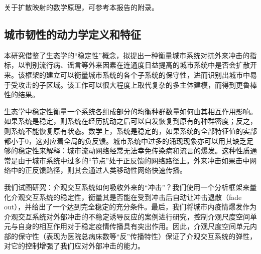 关于扩散映射的数学原理，可参考本报告的附录。


\subsection{城市韧性的动力学定义和特征}

本研究借鉴了生态学的“稳定性”概念\cite{may1972will, allesina2012stability}，拟提出一种衡量城市系统对抗外来冲击的指标，以判别流行病、谣言等外来因素在连通度日益提高的城市系统中是否会扩散开来。该框架的建立可以衡量城市系统的各个子系统的保守性，进而识别出城市中易于受攻击的子区域。该工作可以很大程度上取代复杂的多主体建模，而得到更鲁棒性的结果。

生态学中稳定性衡量一个系统各组成部分的均衡种群数量如何由其相互作用影响。如果系统是稳定，则系统在经历扰动之后可以自发恢复到原有的种群密度；反之，则系统不能恢复原有状态。数学上，系统是稳定的，如果系统的全部特征值的实部都小于$0$，这对应着全局的负反馈\cite{coyte2015ecology}。城市系统中过多的涌现现象亦可以用其缺乏足够的稳定性来解释：城市流动网络经常无法幸免传染病和流言的爆发。这种性质通常是由于城市系统中过多的“节点”处于正反馈的网络路径上。外来冲击如果击中网络中的正反馈路径，则其会通过人类移动性网络快速传播。

我们试图研究：介观交互系统如何吸收外来的“冲击”？我们使用一个分析框架来量化介观交互系统的稳定性，衡量其是否能在受到冲击后自动让冲击退散（fade out），并给出了一个达到完全稳定的充分条件。最后，我们将城市内疫情爆发作为介观交互系统对外部冲击的不稳定诱导反应的案例进行研究，控制介观尺度空间单元与自身的相互作用对于稳定疫情传播具有突出作用。因此，介观尺度空间单元内部的保守性（表现为医院总病床数等“反”传播特性）保证了介观交互系统的弹性，对它的控制增强了我们应对外部冲击的能力。

